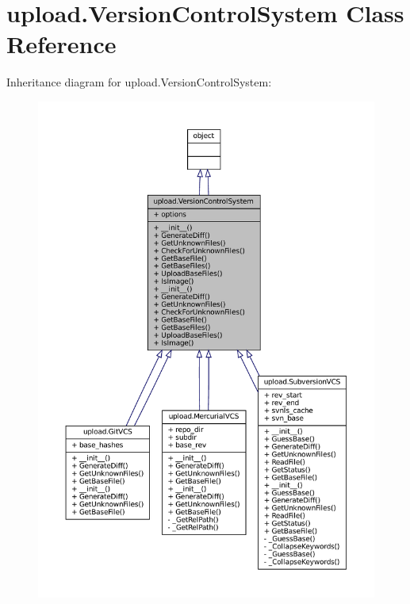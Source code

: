 \hypertarget{classupload_1_1VersionControlSystem}{}\section{upload.\+Version\+Control\+System Class Reference}
\label{classupload_1_1VersionControlSystem}


Inheritance diagram for upload.\+Version\+Control\+System\+:
\nopagebreak
\begin{figure}[H]
\begin{center}
\leavevmode
\includegraphics[width=350pt]{classupload_1_1VersionControlSystem__inherit__graph}
\end{center}
\end{figure}


